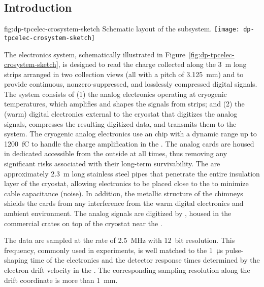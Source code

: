 \subsection{Introduction}
\label{ssec:dp-tpcelec-intro}

\begin{dunefigure}{fig:dp-tpcelec-crosystem-sketch}
{Schematic layout of the   subsystem.}
\texttt{[image: dp-tpcelec-crosystem-sketch]}
\end{dunefigure}


The  electronics system, schematically illustrated in  Figure~\ref{fig:dp-tpcelec-crosystem-sketch}, is designed to read the charge collected along the \SI{3}{m} long  strips arranged in two collection views (all with a pitch of \SI{3.125}{mm}) and 
to provide continuous, nonzero-suppressed, and losslessly compressed digital signals.  
The system consists of (1) the  analog electronics operating at cryogenic temperatures, which amplifies and shapes the signals from  strips; and (2) the (warm) digital electronics external to the cryostat that digitizes the analog signals, compresses the resulting digitized data, and transmits them to the  system.  The cryogenic  analog electronics use an  chip with a dynamic range up to \SI{1200}{fC} to handle %
the charge amplification in the . The analog  cards are housed in dedicated  accessible from the outside at all times, thus removing any significant risks associated with their long-term survivability. The  are approximately \SI{2.3}{m} long stainless steel pipes that %
penetrate the entire insulation layer of the cryostat, allowing  electronics to be placed close to the  to minimize cable capacitance (noise).  In addition, the metallic structure of the chimneys shields the  cards from any interference from the warm digital electronics and ambient environment. The analog signals are digitized by , housed in the commercial  crates on top of the cryostat near the . 

The  data are sampled at the rate of \SI{2.5}{MHz} with \SI{12}{bit} resolution. This frequency, %
commonly used in  experiments, is well matched to the \SI{1}{\micro\second} pulse-shaping time of the  electronics and the detector response times determined by the electron drift velocity in the . The corresponding sampling resolution along the drift coordinate is more than \SI{1}{\mm}. 


